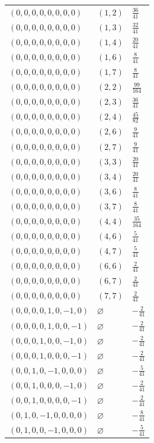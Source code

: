 \begin{longtable}{@{}lll@{}}
$(0,0,0,0,0,0,0,0)$ & $(1,2)$ & $\frac{36}{41}$\\
$(0,0,0,0,0,0,0,0)$ & $(1,3)$ & $\frac{32}{41}$\\
$(0,0,0,0,0,0,0,0)$ & $(1,4)$ & $\frac{20}{41}$\\
$(0,0,0,0,0,0,0,0)$ & $(1,6)$ & $\frac{8}{41}$\\
$(0,0,0,0,0,0,0,0)$ & $(1,7)$ & $\frac{8}{41}$\\
$(0,0,0,0,0,0,0,0)$ & $(2,2)$ & $\frac{99}{164}$\\
$(0,0,0,0,0,0,0,0)$ & $(2,3)$ & $\frac{36}{41}$\\
$(0,0,0,0,0,0,0,0)$ & $(2,4)$ & $\frac{45}{82}$\\
$(0,0,0,0,0,0,0,0)$ & $(2,6)$ & $\frac{9}{41}$\\
$(0,0,0,0,0,0,0,0)$ & $(2,7)$ & $\frac{9}{41}$\\
$(0,0,0,0,0,0,0,0)$ & $(3,3)$ & $\frac{20}{41}$\\
$(0,0,0,0,0,0,0,0)$ & $(3,4)$ & $\frac{20}{41}$\\
$(0,0,0,0,0,0,0,0)$ & $(3,6)$ & $\frac{8}{41}$\\
$(0,0,0,0,0,0,0,0)$ & $(3,7)$ & $\frac{8}{41}$\\
$(0,0,0,0,0,0,0,0)$ & $(4,4)$ & $\frac{35}{164}$\\
$(0,0,0,0,0,0,0,0)$ & $(4,6)$ & $\frac{5}{41}$\\
$(0,0,0,0,0,0,0,0)$ & $(4,7)$ & $\frac{5}{41}$\\
$(0,0,0,0,0,0,0,0)$ & $(6,6)$ & $\frac{2}{41}$\\
$(0,0,0,0,0,0,0,0)$ & $(6,7)$ & $\frac{2}{41}$\\
$(0,0,0,0,0,0,0,0)$ & $(7,7)$ & $\frac{2}{41}$\\
$(0,0,0,0,1,0,-1,0)$ & $\varnothing$ & $-\frac{2}{41}$\\
$(0,0,0,0,1,0,0,-1)$ & $\varnothing$ & $-\frac{2}{41}$\\
$(0,0,0,1,0,0,-1,0)$ & $\varnothing$ & $-\frac{2}{41}$\\
$(0,0,0,1,0,0,0,-1)$ & $\varnothing$ & $-\frac{2}{41}$\\
$(0,0,1,0,-1,0,0,0)$ & $\varnothing$ & $-\frac{5}{41}$\\
$(0,0,1,0,0,0,-1,0)$ & $\varnothing$ & $-\frac{2}{41}$\\
$(0,0,1,0,0,0,0,-1)$ & $\varnothing$ & $-\frac{2}{41}$\\
$(0,1,0,-1,0,0,0,0)$ & $\varnothing$ & $-\frac{8}{41}$\\
$(0,1,0,0,-1,0,0,0)$ & $\varnothing$ & $-\frac{5}{41}$\\

\end{longtable}
